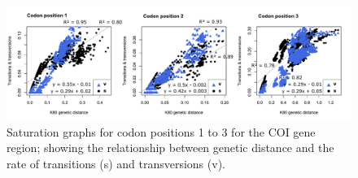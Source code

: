 \begin{landscape}
\begin{figure}[]
	\centering
	\includegraphics[scale =0.75]{Images/saturation_COI.pdf}
	\caption{Saturation graphs for codon positions 1 to 3 for the COI gene region; showing the relationship between genetic distance and the rate of transitions (s) and transversions (v).}
	\label{fig:COI_saturation_graphs}
\end{figure}
\end{landscape}






